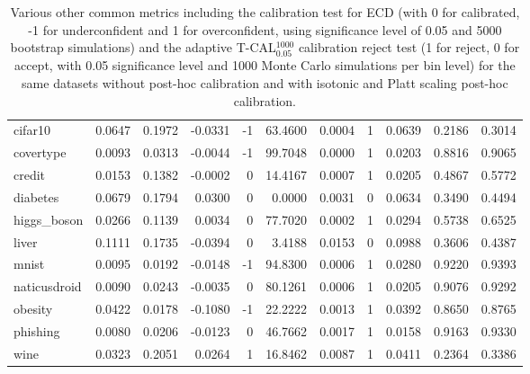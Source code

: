 \documentclass{article}
\theoremstyle{plain}
\theoremstyle{definition}
\theoremstyle{remark}
\begin{document}
\begin{table}[ht]
\begin{tabular}{lrrrrrrrrrr}
cifar10 & 0.0647 & 0.1972 & -0.0331 & -1 & 63.4600 & 0.0004 & 1 & 0.0639 & 0.2186 & 0.3014 \\
covertype & 0.0093 & 0.0313 & -0.0044 & -1 & 99.7048 & 0.0000 & 1 & 0.0203 & 0.8816 & 0.9065 \\
credit & 0.0153 & 0.1382 & -0.0002 & 0 & 14.4167 & 0.0007 & 1 & 0.0205 & 0.4867 & 0.5772 \\
diabetes & 0.0679 & 0.1794 & 0.0300 & 0 & 0.0000 & 0.0031 & 0 & 0.0634 & 0.3490 & 0.4494 \\
higgs\_boson & 0.0266 & 0.1139 & 0.0034 & 0 & 77.7020 & 0.0002 & 1 & 0.0294 & 0.5738 & 0.6525 \\
liver & 0.1111 & 0.1735 & -0.0394 & 0 & 3.4188 & 0.0153 & 0 & 0.0988 & 0.3606 & 0.4387 \\
mnist & 0.0095 & 0.0192 & -0.0148 & -1 & 94.8300 & 0.0006 & 1 & 0.0280 & 0.9220 & 0.9393 \\
naticusdroid & 0.0090 & 0.0243 & -0.0035 & 0 & 80.1261 & 0.0006 & 1 & 0.0205 & 0.9076 & 0.9292 \\
obesity & 0.0422 & 0.0178 & -0.1080 & -1 & 22.2222 & 0.0013 & 1 & 0.0392 & 0.8650 & 0.8765 \\
phishing & 0.0080 & 0.0206 & -0.0123 & 0 & 46.7662 & 0.0017 & 1 & 0.0158 & 0.9163 & 0.9330 \\
wine & 0.0323 & 0.2051 & 0.0264 & 1 & 16.8462 & 0.0087 & 1 & 0.0411 & 0.2364 & 0.3386 \\
\bottomrule
\end{tabular}
\caption{Various other common metrics including the calibration test for ECD (with 0 for calibrated, -1 for underconfident and 1 for overconfident, using significance level of 0.05 and 5000 bootstrap simulations) and the adaptive T-CAL$^{1000}_{0.05}$ calibration reject test (1 for reject, 0 for accept, with 0.05 significance level and 1000 Monte Carlo simulations per bin level) for the same datasets without post-hoc calibration and with isotonic and Platt scaling post-hoc calibration.}
\label{tab:alt_indicators}
\end{table}
\end{document}
